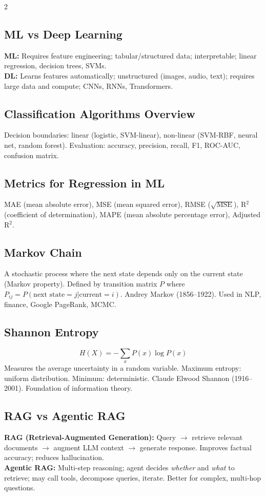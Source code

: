 \documentclass[10pt,a4paper]{article}
\begin{document}
\begin{multicols}{2}
\subsection{ML vs Deep Learning}
\textbf{ML:} Requires feature engineering; tabular/structured data; interpretable; linear regression, decision trees, SVMs.\\
\textbf{DL:} Learns features automatically; unstructured (images, audio, text); requires large data and compute; CNNs, RNNs, Transformers.

\subsection{Classification Algorithms Overview}
Decision boundaries: linear (logistic, SVM-linear), non-linear (SVM-RBF, neural net, random forest). Evaluation: accuracy, precision, recall, F1, ROC-AUC, confusion matrix.

\subsection{Metrics for Regression in ML}
MAE (mean absolute error), MSE (mean squared error), RMSE ($\sqrt{\text{MSE}}$), R$^2$ (coefficient of determination), MAPE (mean absolute percentage error), Adjusted R$^2$.

\subsection{Markov Chain}
A stochastic process where the next state depends only on the current state (Markov property). Defined by transition matrix $P$ where $P_{ij} = P(\text{next state}=j | \text{current}=i)$. Andrey Markov (1856--1922). Used in NLP, finance, Google PageRank, MCMC.

\subsection{Shannon Entropy}
\[
H(X) = -\sum_x P(x)\log P(x)
\]
Measures the average uncertainty in a random variable. Maximum entropy: uniform distribution. Minimum: deterministic. Claude Elwood Shannon (1916--2001). Foundation of information theory.

\subsection{RAG vs Agentic RAG}
\textbf{RAG (Retrieval-Augmented Generation):} Query $\to$ retrieve relevant documents $\to$ augment LLM context $\to$ generate response. Improves factual accuracy; reduces hallucination.\\
\textbf{Agentic RAG:} Multi-step reasoning; agent decides \emph{whether} and \emph{what} to retrieve; may call tools, decompose queries, iterate. Better for complex, multi-hop questions.


\end{multicols}
\end{document}
